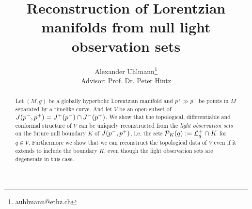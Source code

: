 \documentclass[12pt,notitlepage]{report}
\title{Reconstruction of Lorentzian manifolds from null light observation sets}
\author{Alexander Uhlmann\thanks{auhlmann@ethz.ch}\\
Advisor: Prof. Dr. Peter Hintz}
\begin{document}
\maketitle


\begin{abstract}
    Let $(M,g)$ be a globally hyperbolic Lorentzian manifold and $p^+\gg p^-$ be points in $M$ separated by a timelike curve. And let $V$ be an open subset of $J(p^-,p^+) = J^+(p^-)\cap J^-(p^+)$. We show that the topological, differentiable and conformal structure of $V$ can be uniquely reconstructed from the \emph{light observation sets} on the future null boundary $K$ of $J(p^-,p^+)$, i.e. the sets ${\mathcal{P}}_K(q) := {\mathcal{L}}^+_q \cap K$ for $q\in V$. Furthermore we show that we can reconstruct the topological data of $V$ even if it extends to include the boundary $K$, even though the light observation sets are degenerate in this case.
\end{abstract}


\tableofcontents






%
%


%
%
%

%
%

\newpage

\nocite{*}
\printbibliography

\appendix




%

%
\end{document}

